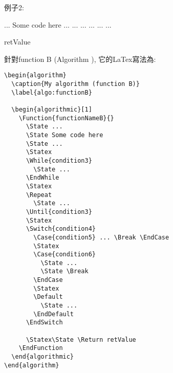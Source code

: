 
\newpage
例子2:
\begin{algorithm}
  \caption{My algorithm (function B)}
  \label{algo:functionB}

  \begin{algorithmic}[1]
      \State ...
      \State Some code here
      \State ...
      \Statex
        \State ...
      \EndWhile
      \Statex
      \Repeat
        \State ...
      \Statex
         ... \Break \EndCase
        \Statex
          \State ...
          \State \Break
        \EndCase
        \Statex
        \Default
          \State ...
        \EndDefault
      \EndSwitch

      \Statex\State \Return retValue
    \EndFunction
  \end{algorithmic}
\end{algorithm}

\newpage
針對function B (Algorithm ), 它的LaTex寫法為:\\

\begin{DescriptionFrame}
  \begin{verbatim}
\begin{algorithm}
  \caption{My algorithm (function B)}
  \label{algo:functionB}

  \begin{algorithmic}[1]
    \Function{functionNameB}{}
      \State ...
      \State Some code here
      \State ...
      \Statex
      \While{condition3}
        \State ...
      \EndWhile
      \Statex
      \Repeat
        \State ...
      \Until{condition3}
      \Statex
      \Switch{condition4}
        \Case{condition5} ... \Break \EndCase
        \Statex
        \Case{condition6}
          \State ...
          \State \Break
        \EndCase
        \Statex
        \Default
          \State ...
        \EndDefault
      \EndSwitch

      \Statex\State \Return retValue
    \EndFunction
  \end{algorithmic}
\end{algorithm}
  \end{verbatim}
\end{DescriptionFrame}
